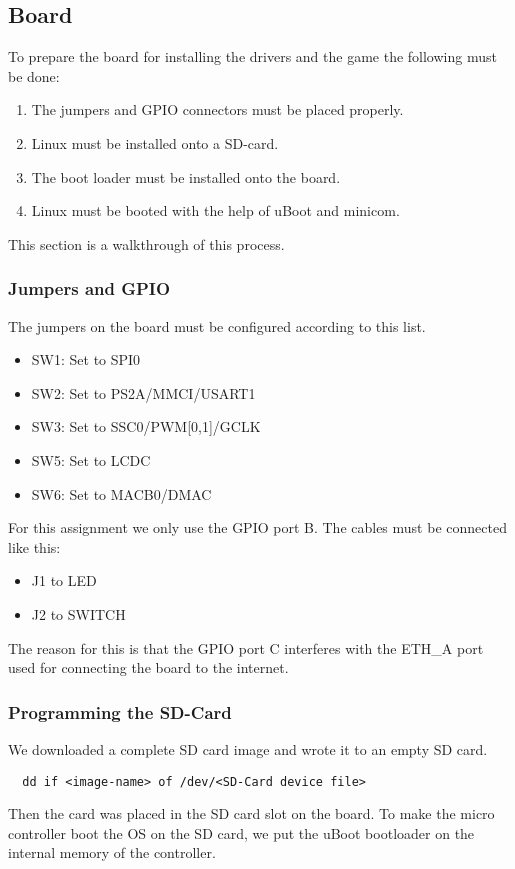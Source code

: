 \subsection{Board}
\label{sec:boardsetup}

To prepare the board for installing the drivers and the game the following must be done:
\begin{enumerate}
  \item The jumpers and GPIO connectors must be placed properly.
  \item Linux must be installed onto a SD-card.
  \item The boot loader must be installed onto the board.
  \item Linux must be booted with the help of uBoot and minicom.
\end{enumerate}

This section is a walkthrough of this process.

\subsubsection{Jumpers and GPIO}

The jumpers on the board must be configured according to this list.

\begin{itemize}
\item SW1: Set to SPI0
\item SW2: Set to PS2A/MMCI/USART1
\item SW3: Set to SSC0/PWM[0,1]/GCLK
\item SW5: Set to LCDC
\item SW6: Set to MACB0/DMAC
\end{itemize}

For this assignment we only use the GPIO port B. The cables must be connected like this:
\begin{itemize}
  \item J1 to LED
  \item J2 to SWITCH
\end{itemize}
The reason for this is that the GPIO port C interferes with the ETH\_A port used for connecting the board to
the internet.

\subsubsection{Programming the SD-Card}
We downloaded a complete SD card image and wrote it to an empty SD card.
\begin{verbatim}
  dd if <image-name> of /dev/<SD-Card device file>
\end{verbatim}
Then the card was placed in the SD card slot on the board. To make the micro controller boot
the OS on the SD card, we put the uBoot bootloader on the internal memory of the controller.

